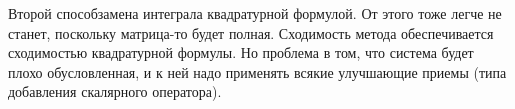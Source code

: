 \documentclass[a4paper]{article}
\begin{document}
Второй способ\т замена интеграла квадратурной формулой. От этого тоже легче не станет, поскольку матрица-то будет полная.
Сходимость метода обеспечивается сходимостью квадратурной формулы. Но проблема в том, что система будет плохо обусловленная, и к ней надо
применять всякие улучшающие приемы (типа добавления скалярного оператора).
\end{document}
